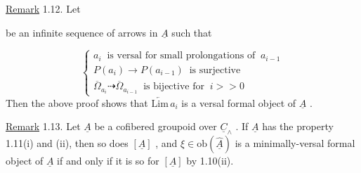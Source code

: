 \underline{Remark} 1.12.  Let
be an infinite sequence of arrows in  $\underline{A}$  such that

\begin{equation*}
\left\{\begin{array}{l}
a_i \ \text{ is versal for small prolongations of } \ a_{i-1} \\[2pt]
P(a_i) \longrightarrow P(a_{i-1}) \ \text{ is surjective} \\[2pt]
\overline{\Omega}_{a_i} \dashrightarrow \overline{\Omega}_{a_{i-1}} \ \text{ is bijective for } \ i >> 0
\end{array}\right.
\end{equation*}
Then the above proof shows that  $\underleftarrow{\mathrm{Lim}}\, a_i$  is a versal formal object of  $\underline{A}$  .

\underline{Remark} 1.13.  Let  $\underline{A}$  be a cofibered groupoid over  $\underline{C}_\wedge$  . If  $\underline{A}$  has the property 1.11(i) and (ii), then so does  $[\underline{A}]$  , and  $\xi \in \mathrm{ob}(\hat{\underline{A}})$  is a minimally-versal formal object of  $\underline{A}$  if and only if it is so for  $[\underline{A}]$  by 1.10(ii).

